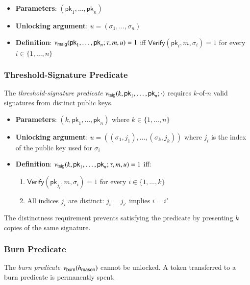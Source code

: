 \begin{itemize}
	\item \textbf{Parameters}: $(\mathsf{pk}_1, \ldots, \mathsf{pk}_n)$
	\item \textbf{Unlocking argument}: $u = (\sigma_1, \ldots, \sigma_n)$
	\item \textbf{Definition}: $\nu_\mathsf{msig}(\mathsf{pk}_1, \ldots, \mathsf{pk}_n; \tau, m, u) = 1$ iff $\mathsf{Verify}(\mathsf{pk}_i, m, \sigma_i) = 1$ for every $i \in \{1, \ldots, n\}$
\end{itemize}


\subsubsection{Threshold-Signature Predicate}

The \emph{threshold-signature predicate} $\nu_\mathsf{tsig}(k, \mathsf{pk}_1, \ldots, \mathsf{pk}_n;\cdot)$ requires $k$-of-$n$ valid signatures from distinct public keys.

\begin{itemize}
	\item \textbf{Parameters}: $(k, \mathsf{pk}_1, \ldots, \mathsf{pk}_n)$ where $k \in \{1, \ldots, n\}$
	\item \textbf{Unlocking argument}: $u = ((\sigma_1, j_1), \ldots, (\sigma_k, j_k))$ where $j_i$ is the index of the public key used for $\sigma_i$
	\item \textbf{Definition}: $\nu_\mathsf{tsig}(k, \mathsf{pk}_1, \ldots, \mathsf{pk}_n; \tau, m, u) = 1$ iff:
	\begin{enumerate}
		\item $\mathsf{Verify}(\mathsf{pk}_{j_i}, m, \sigma_i) = 1$ for every $i \in \{1, \ldots, k\}$
		\item All indices $j_i$ are distinct: $j_i = j_{i'}$ implies $i = i'$
	\end{enumerate}
\end{itemize}

The distinctness requirement prevents satisfying the predicate by presenting $k$ copies of the same signature.


\subsubsection{Burn Predicate}\label{sec:burn-predicate}

The \emph{burn predicate} $\nu_\mathsf{burn}(h_\mathsf{reason})$ cannot be unlocked. A token transferred to a burn predicate is permanently spent.

